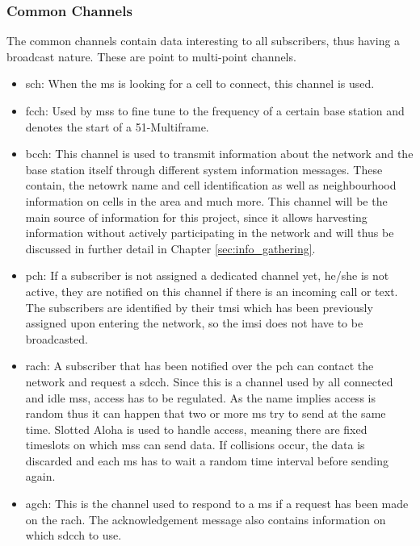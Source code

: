 \subsubsection{Common Channels}
The common channels contain data interesting to all subscribers, thus having a broadcast nature.
These are point to multi-point channels.
\begin{itemize}
	\item \gls{sch}: When the \gls{ms} is looking for a cell to connect, this channel is used.
	\item \gls{fcch}: Used by \glspl{ms} to fine tune to the frequency of a certain base station and denotes the start of a 51-Multiframe.
	\item \gls{bcch}: This channel is used to transmit information about the network and the base station itself through different system information messages.
	These contain, the netowrk name and cell identification as well as neighbourhood information on cells in the area and much more.
	This channel will be the main source of information for this project, since it allows harvesting information without actively participating in the network and will thus be discussed in further detail in Chapter \ref{sec:info_gathering}.
	\item \gls{pch}: If a subscriber is not assigned a dedicated channel yet, \ie he/she is not active, they are notified on this channel if there is an incoming call or text.
	The subscribers are identified by their \gls{tmsi} which has been previously assigned upon entering the network, so the \gls{imsi} does not have to be broadcasted.
	\item \gls{rach}: A subscriber that has been notified over the \gls{pch} can contact the network and request a \gls{sdcch}.
	Since this is a channel used by all connected and idle \glspl{ms}, access has to be regulated.
	As the name implies access is random thus it can happen that two or more \gls{ms} try to send at the same time.
	Slotted Aloha is used to handle access, meaning there are fixed timeslots on which \glspl{ms} can send data.
	If collisions occur, the data is discarded and each \gls{ms} has to wait a random time interval before sending again.
	\item \gls{agch}: This is the channel used to respond to a \gls{ms} if a request has been made on the \gls{rach}.
	The acknowledgement message also contains information on which \gls{sdcch} to use.
\end{itemize}
